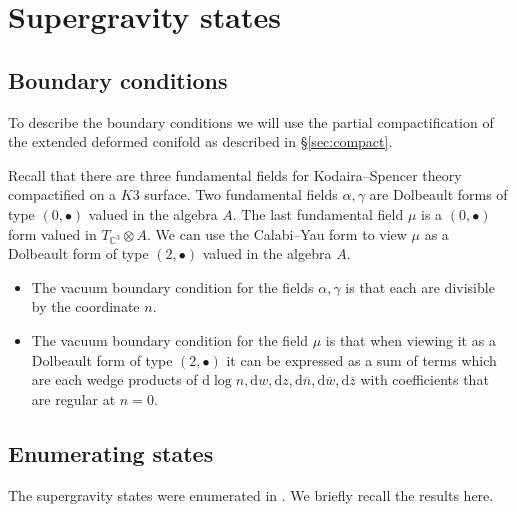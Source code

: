 \documentclass[11pt]{amsart}
\newcommand{\del}{\partial}
\newcommand{\br}{\overline}
\newcommand{\CC}{\mathbb C}
\renewcommand{\d}{\mathrm{d}}
\def\bu{{\bullet}}
\theoremstyle{thm}
\numberwithin{equation}{subsection}
\theoremstyle{def}
\theoremstyle{rem}
\begin{document}
\section{Supergravity states}

\subsection{Boundary conditions}

To describe the boundary conditions we will use the partial compactification of the extended deformed conifold as described in \S \ref{sec:compact}. 

Recall that there are three fundamental fields for Kodaira--Spencer theory compactified on a $K3$ surface.
Two fundamental fields $\alpha, \gamma$ are Dolbeault forms of type $(0,\bu)$ valued in the algebra $A$. 
The last fundamental field $\mu$ is a $(0,\bu)$ form valued in $T_{\CC^3} \otimes A$.
We can use the Calabi--Yau form to view $\mu$ as a Dolbeault form of type $(2,\bu)$ valued in the algebra $A$. 

\begin{itemize}
\item The vacuum boundary condition for the fields $\alpha, \gamma$ is that each are divisible by the coordinate $n$. 
\item The vacuum boundary condition for the field $\mu$ is that when viewing it as a Dolbeault form of type $(2,\bu)$ it can be expressed as a sum of terms which are each wedge products of $\d \log n, \d w, \d z , \d \br n, \d \br w , \d \br z$ with coefficients that are regular at $n = 0$. 
\end{itemize} 


%

\subsection{Enumerating states}

The supergravity states were enumerated in \cite{CP}. 
We briefly recall the results here. 
\end{document}
